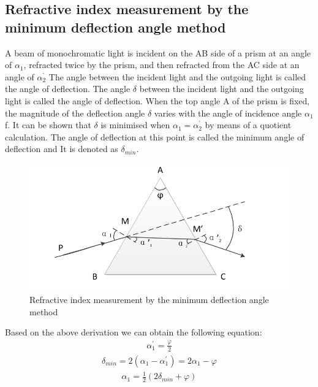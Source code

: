 \documentclass[UTF8]{article}
\begin{document}
	\subsection{Refractive index measurement by the minimum deflection angle method }
    A beam of monochromatic light is incident on the AB side of a prism at an angle of $\alpha _{1} $, refracted twice by the prism, and then refracted from the AC side at an angle of $\alpha^{’} _{2} $ The angle between the incident light and the outgoing light is called the angle of deflection. The angle $\delta $ between the incident light and the outgoing light is called the angle of deflection. When the top angle A of the prism is fixed, the magnitude of the deflection angle $\delta $ varies with the angle of incidence angle $\alpha _{1} $f. It can be shown that $\delta $ is minimised when $\alpha _{1} = \alpha^{’} _{2}  $ by means of a quotient calculation. The angle of deflection at this point is called the minimum angle of deflection and It is denoted as $\delta_{min} $.
    	\begin{figure}[h]
    	\centering
    	\includegraphics[clip,scale=0.8,trim={0 0 0 0}]{fig/fig10.png}
    	\caption{Refractive index measurement by the minimum deflection angle method}
    	\label{figure.10}
    	\end{figure} 
    	
    Based on the above derivation we can obtain the following equation:
    \begin{eqnarray}
     \alpha ^{'}_1 = \frac{\varphi }{2} 
    \end{eqnarray}
    \begin{eqnarray}
         \delta _{min} = 2\left ( \alpha _1 - \alpha ^{'}_1\right ) = 2\alpha _1 - \varphi  
    \end{eqnarray}     
    \begin{eqnarray}     
         \alpha _1 = \frac{1}{2}\left ( 2\delta _{min} + \varphi   \right )  
    \end{eqnarray}
    
\end{document}
